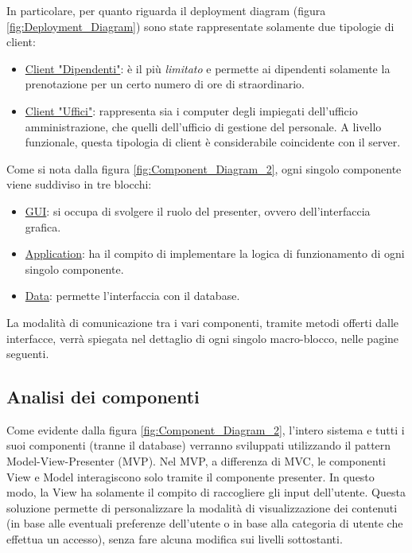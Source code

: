 \noindent
In particolare, per quanto riguarda il deployment diagram (figura \ref{fig:Deployment_Diagram}) sono state rappresentate solamente due tipologie di client:
\begin{itemize}
	\item \underline{Client "Dipendenti"}: è il più \textit{limitato} e permette ai dipendenti solamente la prenotazione per un certo numero di ore di straordinario.
	\item \underline{Client "Uffici"}: rappresenta sia i computer degli impiegati dell'ufficio amministrazione, che quelli dell'ufficio di gestione del personale. A livello funzionale, questa tipologia di client è considerabile coincidente con il server.
\end{itemize}
Come si nota dalla figura \ref{fig:Component_Diagram_2}, ogni singolo componente viene suddiviso in tre blocchi:
\begin{itemize}
	\item \underline{GUI}: si occupa di svolgere il ruolo del presenter, ovvero dell'interfaccia grafica.
	\item \underline{Application}: ha il compito di implementare la logica di funzionamento di ogni singolo componente.
	\item \underline{Data}: permette l'interfaccia con il database.
\end{itemize}
La modalità di comunicazione tra i vari componenti, tramite metodi offerti dalle interfacce, verrà spiegata nel dettaglio di ogni singolo macro-blocco, nelle pagine seguenti.
\subsection{Analisi dei componenti}
Come evidente dalla figura \ref{fig:Component_Diagram_2}, l'intero sistema e tutti i suoi componenti (tranne il database) verranno sviluppati utilizzando il pattern Model-View-Presenter (MVP). Nel MVP, a differenza di MVC, le componenti View e Model interagiscono solo tramite il componente presenter. In questo modo, la View ha solamente il compito di raccogliere gli input dell'utente.
Questa soluzione permette di personalizzare la modalità di visualizzazione dei contenuti (in base alle eventuali preferenze dell'utente o in base alla categoria di utente che effettua un accesso), senza fare alcuna modifica sui livelli sottostanti.
